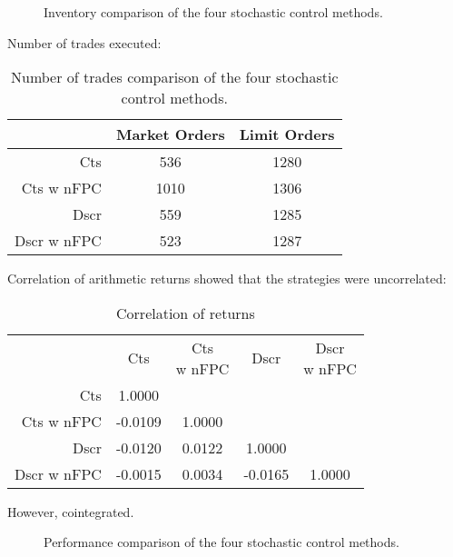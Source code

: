 \begin{figure}
  \centering
  \setlength\figureheight{\linewidth} 
  \setlength\figurewidth{\linewidth}
  
  \caption{Inventory comparison of the four stochastic control methods.}
  \label{fig:ORCL_comp4stoch_inv}
\end{figure}

Number of trades executed:
\begin{table}
\centering
{}
\begin{tabular}{@{} r *{2}{c} @{}}
\toprule
& Market Orders & Limit Orders \\
\midrule
Cts          &  536 & 1280 \\
Cts w nFPC   & 1010 & 1306 \\
Dscr         &  559 & 1285 \\
Dscr w nFPC  &  523 & 1287 \\
\bottomrule
\end{tabular}
\caption{Number of trades comparison of the four stochastic control methods.}
\label{tbl:ORCL_comp4stoch_numt}
\end{table}

Correlation of arithmetic returns showed that the strategies were uncorrelated:
\begin{table}
\centering
{}
\begin{tabular}{@{} r *{4}{c} @{}}
\toprule
& Cts & \cellbreak{t}{c}{Cts \\ w nFPC} & Dscr & \cellbreak{t}{c}{Dscr \\ w nFPC} \\
\cmidrule{2-5}
Cts          &  1.0000  & & & \\
Cts w nFPC   & -0.0109  &  1.0000 &  & \\
Dscr         & -0.0120  &  0.0122 &   1.0000 &  \\
Dscr w nFPC  & -0.0015  &  0.0034 &  -0.0165 &   1.0000 \\
\bottomrule
\end{tabular}
\caption{Correlation of returns}
\label{tbl:ORCL_comp4stoch_corr}
\end{table}

However, cointegrated.

\begin{figure}
  \centering
  \setlength\figureheight{\linewidth} 
  \setlength\figurewidth{\linewidth}
  
  \caption{Performance comparison of the four stochastic control methods.}
  \label{fig:cointeg_relation}
\end{figure}

